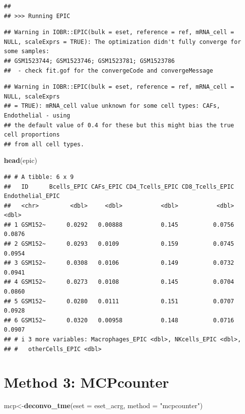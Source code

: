 \documentclass[
  12pt,
]{book}
\newenvironment{Shaded}{\begin{snugshade}}{\end{snugshade}}
\newcommand{\AttributeTok}[1]{\textcolor[rgb]{0.13,0.29,0.53}{#1}}
\newcommand{\FunctionTok}[1]{\textcolor[rgb]{0.13,0.29,0.53}{\textbf{#1}}}
\newcommand{\NormalTok}[1]{#1}
\newcommand{\OtherTok}[1]{\textcolor[rgb]{0.56,0.35,0.01}{#1}}
\newcommand{\StringTok}[1]{\textcolor[rgb]{0.31,0.60,0.02}{#1}}
\theoremstyle{definition}
\theoremstyle{definition}
\theoremstyle{definition}
\theoremstyle{definition}
\theoremstyle{remark}
\begin{document}
\begin{verbatim}
## 
## >>> Running EPIC
\end{verbatim}

\begin{verbatim}
## Warning in IOBR::EPIC(bulk = eset, reference = ref, mRNA_cell = NULL, scaleExprs = TRUE): The optimization didn't fully converge for some samples:
## GSM1523744; GSM1523746; GSM1523781; GSM1523786
##  - check fit.gof for the convergeCode and convergeMessage
\end{verbatim}

\begin{verbatim}
## Warning in IOBR::EPIC(bulk = eset, reference = ref, mRNA_cell = NULL, scaleExprs
## = TRUE): mRNA_cell value unknown for some cell types: CAFs, Endothelial - using
## the default value of 0.4 for these but this might bias the true cell proportions
## from all cell types.
\end{verbatim}

\begin{Shaded}
\begin{Highlighting}[]
\FunctionTok{head}\NormalTok{(epic)}
\end{Highlighting}
\end{Shaded}

\begin{verbatim}
## # A tibble: 6 x 9
##   ID      Bcells_EPIC CAFs_EPIC CD4_Tcells_EPIC CD8_Tcells_EPIC Endothelial_EPIC
##   <chr>         <dbl>     <dbl>           <dbl>           <dbl>            <dbl>
## 1 GSM152~      0.0292   0.00888           0.145          0.0756           0.0876
## 2 GSM152~      0.0293   0.0109            0.159          0.0745           0.0954
## 3 GSM152~      0.0308   0.0106            0.149          0.0732           0.0941
## 4 GSM152~      0.0273   0.0108            0.145          0.0704           0.0860
## 5 GSM152~      0.0280   0.0111            0.151          0.0707           0.0928
## 6 GSM152~      0.0320   0.00958           0.148          0.0716           0.0907
## # i 3 more variables: Macrophages_EPIC <dbl>, NKcells_EPIC <dbl>,
## #   otherCells_EPIC <dbl>
\end{verbatim}

\hypertarget{method-3-mcpcounter}{%
\section{Method 3: MCPcounter}\label{method-3-mcpcounter}}

\begin{Shaded}
\begin{Highlighting}[]
\NormalTok{mcp}\OtherTok{\textless{}{-}}\FunctionTok{deconvo\_tme}\NormalTok{(}\AttributeTok{eset =}\NormalTok{ eset\_acrg, }\AttributeTok{method =} \StringTok{"mcpcounter"}\NormalTok{)}
\end{Highlighting}
\end{Shaded}
\end{document}
